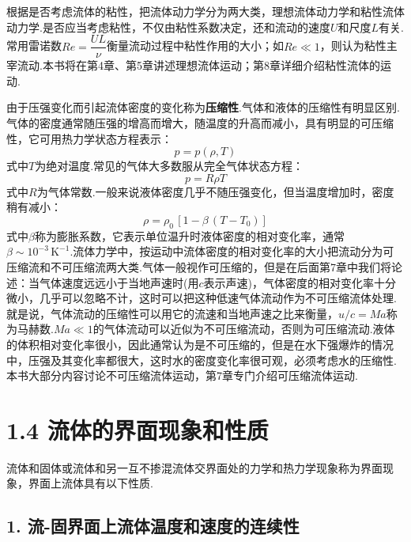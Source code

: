 根据是否考虑流体的粘性，把流体动力学分为两大类，理想流体动力学和粘性流体动力学.是否应当考虑粘性，不仅由粘性系数决定，还和流动的速度$U$和尺度$L$有关.常用雷诺数$Re=\dfrac{UL}{\nu}$衡量流动过程中粘性作用的大小；如$Re\ll 1$，则认为粘性主宰流动.本书将在第4章、第5章讲述理想流体运动；第8章详细介绍粘性流体的运动.

由于压强变化而引起流体密度的变化称为\textbf{压缩性}.气体和液体的压缩性有明显区别.气体的密度通常随压强的增高而增大，随温度的升高而减小，具有明显的可压缩性，它可用热力学状态方程表示：
\begin{equation*}
p=p(\rho,T)
\tag{1.27}
\end{equation*}
式中$T$为绝对温度.常见的气体大多数服从完全气体状态方程：
\begin{equation*}
p=R\rho T
\tag{1.28}
\end{equation*}
式中$R$为气体常数.一般来说液体密度几乎不随压强变化，但当温度增加时，密度稍有减小：
\begin{equation*}
\rho=\rho_0\,[1-\beta\,(T-T_0)]
\tag{1.29}
\end{equation*}
式中$\beta$称为膨胀系数，它表示单位温升时液体密度的相对变化率，通常$\beta\sim 10^{-3}\,\mathrm{K}^{-1}$.流体力学中，按运动中流体密度的相对变化率的大小把流动分为可压缩流和不可压缩流两大类.气体一般视作可压缩的，但是在后面第7章中我们将论述：当气体速度远远小于当地声速时(用$c$表示声速)，气体密度的相对变化率十分微小，几乎可以忽略不计，这时可以把这种低速气体流动作为不可压缩流体处理.就是说，气体流动的压缩性可以用它的流速和当地声速之比来衡量，$u/c=Ma$称为马赫数.$Ma\ll 1$的气体流动可以近似为不可压缩流动，否则为可压缩流动.液体的体积相对变化率很小，因此通常认为是不可压缩的，但是在水下强爆炸的情况中，压强及其变化率都很大，这时水的密度变化率很可观，必须考虑水的压缩性.本书大部分内容讨论不可压缩流体运动，第7章专门介绍可压缩流体运动.

\section*{1.4  流体的界面现象和性质}

流体和固体或流体和另一互不掺混流体交界面处的力学和热力学现象称为界面现象，界面上流体具有以下性质.

\subsection*{1. 流-固界面上流体温度和速度的连续性}


